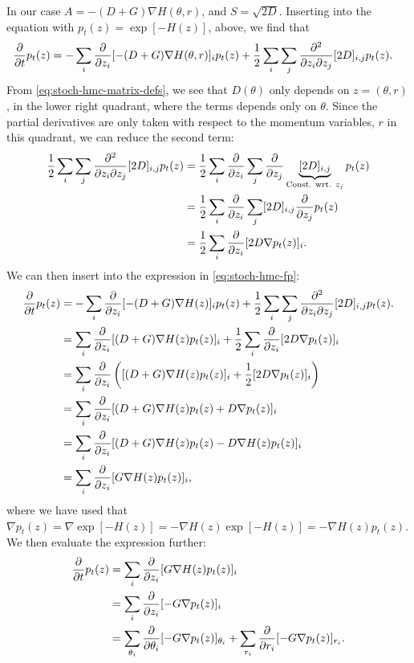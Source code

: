 In our case $A = -(D+G)\nabla H(\theta, r)$, and $S = \sqrt{2D}$.
Inserting into the equation with $p_t(z) = \exp[-H(z)]$, above, we find that
\begin{align} \label{eq:stoch-hmc-fp}
    \pdv{t} p_t(z) &= - \sum_{i} \pdv{z_i} [ -(D+G)\nabla H(\theta, r)]_i p_t(z) 
    + \frac{1}{2}\sum_{i}\sum_{j}\pdv{}{z_i}{z_j}[2D]_{i,j}p_t(z). 
\end{align}
From \cref{eq:stoch-hmc-matrix-defs}, we see that $D(\theta)$ only depends on $z= (\theta, r)$, in the lower right quadrant, where the terms depends only on $\theta$.
Since the partial derivatives are only taken with respect to the momentum variables, $r$ in this quadrant, we can reduce the second term:
\begin{align}
    \frac{1}{2}\sum_{i}\sum_{j}\pdv{}{z_i}{z_j}[2D]_{i,j}p_t(z)
    &= \frac{1}{2}\sum_{i}\pdv{z_i}\sum_{j}\pdv{z_j}\underbrace{[2D]_{i,j}}_{\text{Const. wrt. $z_j$}}p_t(z) \\
    &= \frac{1}{2}\sum_{i}\pdv{z_i}\sum_{j}[2D]_{i,j}\pdv{z_j}p_t(z)\\
    &= \frac{1}{2}\sum_{i}\pdv{z_i}[2D \nabla p_t(z)]_{i}.
\end{align}
We can then insert into the expression in \cref{eq:stoch-hmc-fp}:
\begin{align} 
    \pdv{t} p_t(z) &= - \sum_{i} \pdv{z_i} [ -(D+G)\nabla H(z)]_i p_t(z) 
    + \frac{1}{2}\sum_{i}\sum_{j}\pdv{}{z_i}{z_j}[2D]_{i,j}p_t(z). \\
    &=  \sum_{i} \pdv{z_i} [ (D+G)\nabla H(z)p_t(z)]_i 
    + \frac{1}{2}\sum_{i}\pdv{z_i}[2D \nabla p_t(z)]_{i} \\
    &=  \sum_{i} \pdv{z_i} \left([ (D+G)\nabla H(z)p_t(z)]_i 
    + \frac{1}{2}[2D \nabla p_t(z)]_{i}\right) \\
    &=  \sum_{i} \pdv{z_i} [ (D+G)\nabla H(z)p_t(z) 
    + D \nabla p_t(z)]_{i} \\
    &=  \sum_{i} \pdv{z_i} [ (D+G)\nabla H(z)p_t(z) 
    - D \nabla H(z) p_t(z)]_{i} \\
    &=  \sum_{i} \pdv{z_i} [ G\nabla H(z)p_t(z)]_i,
\end{align}
where we have used that $\nabla p_t(z) = \nabla \exp[-H(z)]= -\nabla H(z) \exp[-H(z)] =  -\nabla H(z) p_t(z)$.
We then evaluate the expression further:
\begin{align}
    \pdv{t} p_t(z) &= \sum_{i} \pdv{z_i} [ G\nabla H(z)p_t(z)]_i \\
    &= \sum_{i} \pdv{z_i} [ -G\nabla p_t(z)]_i \\
    &= \sum_{\theta_i} \pdv{\theta_i} [ -G\nabla p_t(z)]_{\theta_i}
    + \sum_{r_i} \pdv{r_i} [ -G\nabla p_t(z)]_{r_i}.
\end{align}
